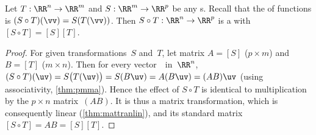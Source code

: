 \begin{theorem} \label{thm:stmatcomp} 
Let \(T:\RR^n\to\RR^m\) and \(S:\RR^m\to\RR^p\) be any s.  
Recall that the  of functions is \((S\circ T)(\vv)=S(T(\vv))\). 
Then \(S\circ T:\RR^n\to\RR^p\) is a  with  \([S\circ T]=[S][T]\).
\end{theorem}

\begin{proof} 
For given transformations~\(S\) and~\(T\), let matrix \(A=[S]\) (\(p\times m\)) and \(B=[T]\) (\(m\times n\)).
Then for every vector~\uv\ in~\(\RR^n\), 
\((S\circ T)(\uv)
=S\big(T(\uv)\big)
=S(B\uv)
=A(B\uv)
=(AB)\uv\) (using associativity, \cref{thm:pmma}).
Hence the effect of \(S\circ T\) is identical to multiplication by the  \(p\times n\) matrix~\((AB)\).
It is thus a matrix transformation, which is consequently linear (\cref{thm:mattranlin}), and its standard matrix \([S\circ T]=AB=[S][T]\).
\end{proof}


